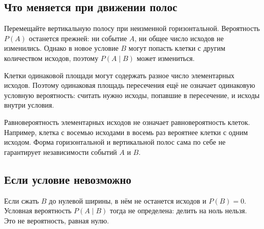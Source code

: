 \subsection{Что меняется при движении полос}
Перемещайте вертикальную полосу при неизменной горизонтальной. Вероятность $P(A)$ останется прежней: ни событие $A$, ни общее число исходов не изменились. Однако в новое условие $B$ могут попасть клетки с другим количеством исходов, поэтому $P(A\mid B)$ может измениться.

Клетки одинаковой площади могут содержать разное число элементарных исходов. Поэтому одинаковая площадь пересечения ещё не означает одинаковую условную вероятность: считать нужно исходы, попавшие в пересечение, и исходы внутри условия.

Равновероятность элементарных исходов не означает равновероятность клеток. Например, клетка с восемью исходами в восемь раз вероятнее клетки с одним исходом. Форма горизонтальной и вертикальной полос сама по себе не гарантирует независимости событий $A$ и $B$.

\subsection{Если условие невозможно}
Если сжать $B$ до нулевой ширины, в нём не останется исходов и $P(B)=0$. Условная вероятность $P(A\mid B)$ тогда не определена: делить на ноль нельзя. Это не вероятность, равная нулю.
